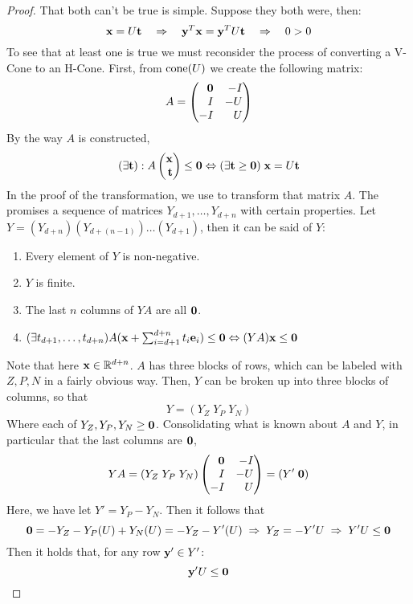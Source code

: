 \begin{proof}  That both can't be true is simple.  Suppose they both were, then:
	\[ \mathbf{x} = U\mathbf{t} \quad\Rightarrow\quad \mathbf{y}^T\mathbf{x} = \mathbf{y}^T U\mathbf{t} \quad\Rightarrow\quad 0 > 0 \]
	To see that at least one is true we must reconsider the process of converting a V-Cone to an H-Cone.  First, from $\operatorname{cone}(U)$ we create the following matrix:
	\[ A = \begin{pmatrix*}[r] \0 & -I \\ I & -U \\ -I & U \end{pmatrix*}  \]
	By the way $A$ is constructed,
	\begin{equation}\label{eq:flcone}
		(\exists \t) : A \xt \leq \0 \Leftrightarrow (\exists \t\geq\0)\; \x = U\t
	\end{equation}
	In the proof of the transformation, we use  to transform that matrix $A$.  The  promises a sequence of matrices $Y_{d+1}, \dots, Y_{d+n}$ with certain properties.  Let $Y = (Y_{d+n})(Y_{d+(n-1)})\dots(Y_{d+1})$, then it can be said of $Y$:
	\begin{enumerate}
		\item Every element of $Y$ is non-negative.
		\item $Y$ is finite.
		\item The last $n$ columns of $YA$ are all $\mathbf{0}$.
		\item \((\exists t_{d+1},\dots,t_{d+n})A(\mathbf{x} + \sum_{i=d+1}^{d+n} t_i\mathbf{e}_i) \leq \mathbf{0}
		      \Leftrightarrow (YA)\mathbf{x} \leq \mathbf{0} \)
	\end{enumerate}
	Note that here $\mathbf{x} \in \mathbb{R}^{d+n}$.  $A$ has three blocks of rows, which can be labeled with $Z,P,N$ in a fairly obvious way.  Then, $Y$ can be broken up into three blocks of columns, so that
	\[ Y = (Y_Z \; Y_P \; Y_N) \]
	Where each of $Y_Z,Y_P,Y_N \geq \mathbf{0}$.  Consolidating what is known about $A$ and $Y$, in particular that the last columns are $\mathbf{0}$,
	\[ YA = (Y_Z \; Y_P \; Y_N) \begin{pmatrix*}[r] \0 & -I \\ I & -U \\ -I & U \end{pmatrix*}
		= (Y' \; \0) \]
	Here, we have let $Y' = Y_P - Y_N$.  Then it follows that
	\[ \mathbf{0} = -Y_Z - Y_P(U) + Y_N(U) = -Y_Z - Y'(U) \;\Rightarrow\; Y_Z = - Y'U
		\;\Rightarrow\; Y'U \leq \mathbf{0} \]
	Then it holds that, for any row $\mathbf{y}' \in Y'$:
	\begin{equation}\label{eq:flneg}
		\mathbf{y}'U \leq \mathbf{0}
	\end{equation}

\end{proof}
